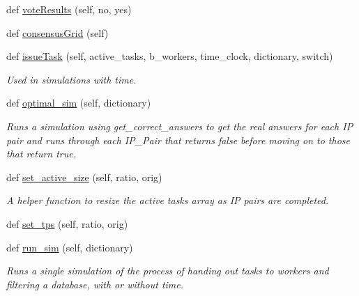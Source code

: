 \begin{DoxyCompactItemize}
def \mbox{\hyperlink{classdynamicfilterapp_1_1test__simulations_1_1_simulation_test_a042330aaf0a341a79e80194c2637c1ef}{vote\+Results}} (self, no, yes)
\item 
def \mbox{\hyperlink{classdynamicfilterapp_1_1test__simulations_1_1_simulation_test_ace5df674cddd1b8f77748b585a69feb9}{consensus\+Grid}} (self)
\item 
def \mbox{\hyperlink{classdynamicfilterapp_1_1test__simulations_1_1_simulation_test_aafa7931ff8d8bbd5249cafe384bc43a6}{issue\+Task}} (self, active\+\_\+tasks, b\+\_\+workers, time\+\_\+clock, dictionary, switch)
\begin{DoxyCompactList}\small\item\em Used in simulations with time. \end{DoxyCompactList}\item 
def \mbox{\hyperlink{classdynamicfilterapp_1_1test__simulations_1_1_simulation_test_a0aba4abd60e324efa57ee26748f87aea}{optimal\+\_\+sim}} (self, dictionary)
\begin{DoxyCompactList}\small\item\em Runs a simulation using get\+\_\+correct\+\_\+answers to get the real answers for each IP pair and runs through each I\+P\+\_\+\+Pair that returns false before moving on to those that return true. \end{DoxyCompactList}\item 
def \mbox{\hyperlink{classdynamicfilterapp_1_1test__simulations_1_1_simulation_test_a966a3c31662ba0c8c2d3d095899ec1ad}{set\+\_\+active\+\_\+size}} (self, ratio, orig)
\begin{DoxyCompactList}\small\item\em A helper function to resize the active tasks array as IP pairs are completed. \end{DoxyCompactList}\item 
def \mbox{\hyperlink{classdynamicfilterapp_1_1test__simulations_1_1_simulation_test_aad2d8e9dd7aa97a8929ef0f348af5f52}{set\+\_\+tps}} (self, ratio, orig)
\item 
def \mbox{\hyperlink{classdynamicfilterapp_1_1test__simulations_1_1_simulation_test_a7c1fa7ae63b7dde48b4c91c2eeda3b75}{run\+\_\+sim}} (self, dictionary)
\begin{DoxyCompactList}\small\item\em Runs a single simulation of the process of handing out tasks to workers and filtering a database, with or without time. \end{DoxyCompactList}\item 

\end{DoxyCompactItemize}
